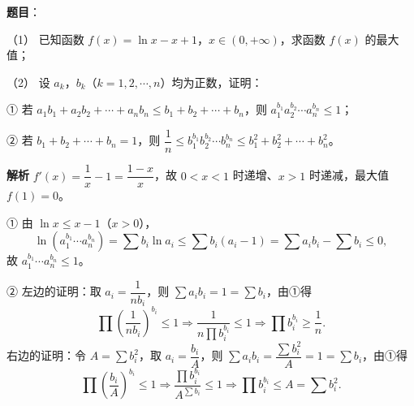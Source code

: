 \begin{answer}

\textbf{题目}：

（1） 已知函数 $f(x)=\ln x-x+1$，$x\in(0,+\infty)$，求函数 $f(x)$ 的最大值；

（2） 设 $a_k$，$b_k$（$k=1,2,\cdots,n$）均为正数，证明：

① 若 $a_1b_1+a_2b_2+\cdots+a_nb_n\leqslant b_1+b_2+\cdots+b_n$，则 $a_1^{b_1}a_2^{b_2}\cdots a_n^{b_n}\leqslant1$；

② 若 $b_1+b_2+\cdots+b_n=1$，则 $\dfrac1n\leqslant b_1^{b_1}b_2^{b_2}\cdots b_n^{b_n}\leqslant b_1^2+b_2^2+\cdots+b_n^2$。

\textbf{解析}
$f'(x)=\dfrac1x-1=\dfrac{1-x}x$，故 $0<x<1$ 时递增、$x>1$ 时递减，最大值 $f(1)=0$。

① 由 $\ln x\leqslant x-1$（$x>0$），
\nopagebreak[4]
\[\ln\left(a_1^{b_1}\cdots a_n^{b_n}\right)=\sum b_i\ln a_i\leqslant\sum b_i(a_i-1)
=\sum a_ib_i-\sum b_i\leqslant0,\]
故 $a_1^{b_1}\cdots a_n^{b_n}\leqslant1$。

② 左边的证明：取 $a_i=\dfrac1{nb_i}$，则 $\sum a_ib_i=1=\sum b_i$，由①得
\nopagebreak[4]
\[\prod\left(\frac1{nb_i}\right)^{b_i}\leqslant1\Longrightarrow\frac1{n\prod b_i^{b_i}}\leqslant1
\Longrightarrow\prod b_i^{b_i}\geqslant\frac1n.\]
右边的证明：令 $A=\sum b_i^2$，取 $a_i=\dfrac{b_i}{A}$，则 $\sum a_ib_i=\dfrac{\sum b_i^2}{A}=1=\sum b_i$，由①得
\nopagebreak[4]
\[\prod\left(\frac{b_i}{A}\right)^{b_i}\leqslant1\Longrightarrow\frac{\prod b_i^{b_i}}{A^{\sum b_i}}\leqslant1
\Longrightarrow\prod b_i^{b_i}\leqslant A=\sum b_i^2.\]



\end{answer}